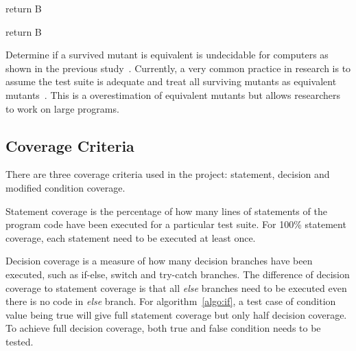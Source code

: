 \begin{algorithm}[H]
	\label{algo:A>B}
	{return B\;
	}
	\caption{Return the number with highest value}
	\bigskip
\end{algorithm}

\begin{algorithm}[H]
	\label{algo:A>=B}
	{
		return B\;
	}
	\caption{Return the number with highest value}
	\bigskip
\end{algorithm}

Determine if a survived mutant is equivalent is undecidable for computers as shown in the previous study~\cite{budd1982two}. Currently, a very common practice in research is to assume the test suite is adequate and treat all surviving mutants as equivalent mutants~\cite{jia2011analysis}. This is a overestimation of equivalent mutants but allows researchers to work on large programs.

\subsection{Coverage Criteria}
There are three coverage criteria used in the project: statement, decision and modified condition coverage.

Statement coverage is the percentage of how many lines of statements of the program code have been executed for a particular test suite. For 100\% statement coverage, each statement need to be executed at least once.

Decision coverage is a measure of how many decision branches have been executed, such as if-else, switch and try-catch branches. The difference of decision coverage to statement coverage is that all \textit{else} branches need to be executed even there is no code in \textit{else} branch.  For algorithm~\ref{algo:if}, a test case of condition value being true will give full statement coverage but only half decision coverage. To achieve full decision coverage, both true and false condition needs to be tested.

\begin{algorithm}[H]
	\label{algo:if}
	{
	}
	\caption{If-else with implicit else branch}
	\bigskip
\end{algorithm}

